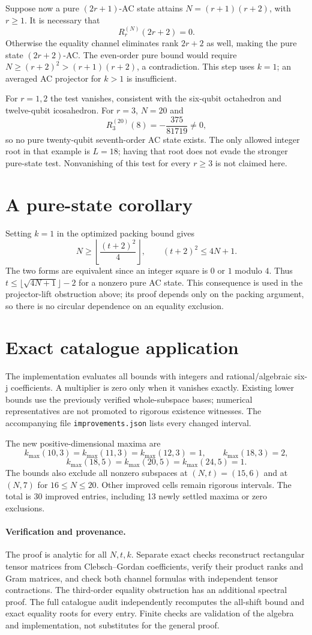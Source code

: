 \documentclass[11pt]{article}
\begin{document}
Suppose now a pure $(2r+1)$-AC state attains $N=(r+1)(r+2)$, with $r\ge1$. It is necessary that
\[
\boxed{R_r^{(N)}(2r+2)=0.}
\]
Otherwise the equality channel eliminates rank $2r+2$ as well, making the pure state $(2r+2)$-AC. The even-order pure bound would require $N\ge(r+2)^2>(r+1)(r+2)$, a contradiction. This step uses $k=1$; an averaged AC projector for $k>1$ is insufficient.

For $r=1,2$ the test vanishes, consistent with the six-qubit octahedron and twelve-qubit icosahedron. For $r=3$, $N=20$ and
\[
R_3^{(20)}(8)=-\frac{375}{81719}\ne0,
\]
so no pure twenty-qubit seventh-order AC state exists. The only allowed integer root in that example is $L=18$; having that root does not evade the stronger pure-state test. Nonvanishing of this test for every $r\ge3$ is not claimed here.


\section{A pure-state corollary}
Setting $k=1$ in the optimized packing bound gives
\[
N\ge\left\lfloor\frac{(t+2)^2}{4}\right\rfloor,
\qquad\boxed{(t+2)^2\le4N+1.}
\]
The two forms are equivalent since an integer square is $0$ or $1$ modulo $4$. Thus $t\le\lfloor\sqrt{4N+1}\rfloor-2$ for a nonzero pure AC state. This consequence is used in the projector-lift obstruction above; its proof depends only on the packing argument, so there is no circular dependence on an equality exclusion.

\section{Exact catalogue application}
The implementation evaluates all bounds with integers and rational/algebraic six-j coefficients. A multiplier is zero only when it vanishes exactly. Existing lower bounds use the previously verified whole-subspace bases; numerical representatives are not promoted to rigorous existence witnesses. The accompanying file \texttt{improvements.json} lists every changed interval.

The new positive-dimensional maxima are
\[
k_{\max}(10,3)=k_{\max}(11,3)=k_{\max}(12,3)=1,\qquad k_{\max}(18,3)=2,
\]
\[
k_{\max}(18,5)=k_{\max}(20,5)=k_{\max}(24,5)=1.
\]
The bounds also exclude all nonzero subspaces at $(N,t)=(15,6)$ and at $(N,7)$ for $16\le N\le20$. Other improved cells remain rigorous intervals. The total is 30 improved entries, including 13 newly settled maxima or zero exclusions.

\paragraph{Verification and provenance.}
The proof is analytic for all $N,t,k$. Separate exact checks reconstruct rectangular tensor matrices from Clebsch--Gordan coefficients, verify their product ranks and Gram matrices, and check both channel formulas with independent tensor contractions. The third-order equality obstruction has an additional spectral proof. The full catalogue audit independently recomputes the all-shift bound and exact equality roots for every entry. Finite checks are validation of the algebra and implementation, not substitutes for the general proof.
\end{document}
